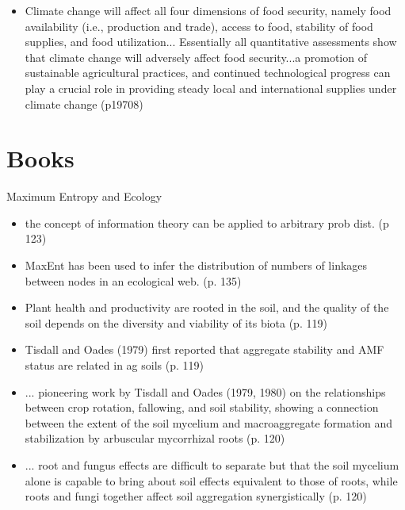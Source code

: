 \documentclass[twoside]{article}	%
\begin{document}
\begin{itemize}
  \item Climate change will affect all four dimensions of food security, namely food availability (i.e., production and trade), access to food, stability of food supplies, and food utilization... Essentially all quantitative assessments show that climate change will adversely affect food security...a promotion of sustainable agricultural practices, and continued technological progress can play a crucial role in providing steady local and international supplies under climate change (p19708)
\end{itemize}





\section{Books}
 Maximum Entropy and Ecology
\begin{itemize}
  \item the concept of information theory can be applied to arbitrary prob dist. (p 123)
  \item MaxEnt has been used to infer the distribution of numbers of linkages between nodes in an ecological web. (p. 135)
\end{itemize}

\begin{itemize}
  \item Plant health and productivity are rooted in the soil, and the quality of the soil depends on the diversity and viability of its biota (p. 119)
  \item Tisdall and Oades (1979) first reported that aggregate stability and AMF status are related in ag soils (p. 119)
  \item ... pioneering work by Tisdall and Oades (1979, 1980) on the relationships between crop rotation, fallowing, and soil stability, showing a connection between the extent of the soil mycelium and macroaggregate formation and stabilization by arbuscular mycorrhizal roots (p. 120)
  \item ... root and fungus effects are difficult to separate but that the soil mycelium alone is capable to bring about soil effects equivalent to those of roots, while roots and fungi together affect soil aggregation synergistically (p. 120)  
\end{itemize}
\end{document}
